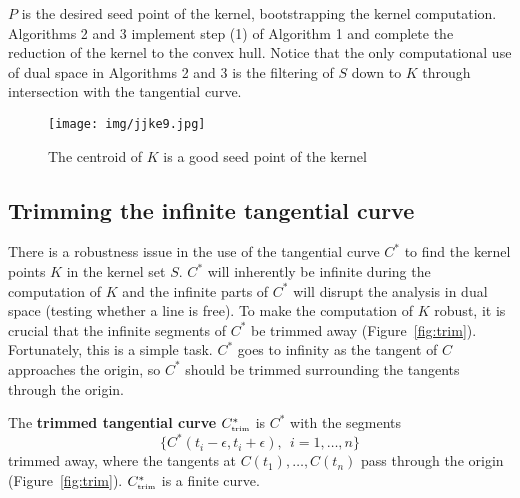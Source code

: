 \documentclass[12pt]{article}
\begin{document}
$P$ is the desired seed point of the kernel,
bootstrapping the kernel computation.
Algorithms 2 and 3 implement step (1) of Algorithm 1
and complete the reduction of the kernel to the convex hull.
Notice that the only computational use of dual space in Algorithms
2 and 3 is the filtering of $S$ down to $K$ through intersection
with the tangential curve.

\begin{figure}[h]
\begin{center}
\texttt{[image: img/jjke9.jpg]}
\end{center}
\caption{The centroid of $K$ is a good seed point of the kernel}
\label{fig:mean}
\end{figure}


\subsection{Trimming the infinite tangential curve}
\label{sec:trim}

There is a robustness issue in the use of the tangential curve $C^*$
to find the kernel points $K$ in the kernel set $S$.
$C^*$ will inherently be infinite during the computation of $K$
and the infinite parts of $C^*$ will disrupt the analysis in dual space
(testing whether a line is free).
To make the computation of $K$ robust,
it is crucial that the infinite segments of $C^*$ be trimmed away 
(Figure~\ref{fig:trim}).
Fortunately, this is a simple task.
$C^*$ goes to infinity as the tangent of $C$
approaches the origin,
so $C^*$ should be trimmed surrounding the tangents through the origin.

\begin{defn2}
The {\bf trimmed tangential curve} $C^*_{\mbox{\tiny{trim}}}$
is $C^*$ with the segments
\[
\{C^*(t_i - \epsilon, t_i + \epsilon),\ \ i=1,\ldots,n\}
\]
trimmed away,
where the tangents at $C(t_1),\ldots,C(t_n)$ pass through the origin
(Figure~\ref{fig:trim}).
$C^*_{\mbox{\tiny{trim}}}$ is a finite curve.
\end{defn2}
\end{document}
